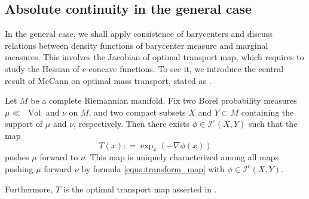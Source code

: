 \subsection{Absolute continuity in the general case}

In the general case, we shall apply consistence of barycenters and
discuss relations between density functions of barycenter measure and marginal measures.
This involves the Jacobian of optimal transport map,
which requires to study the Hessian of $c$-concave functions.
To see it, we introduce the central result of McCann \cite{mccann2001polar} on optimal mass transport,
stated as \cite[Theorem 3.2]{cordero2001riemannian}.
\begin{thm}
	\label{thm:optimal_transport_manifold}
	Let \( M \) be a complete Riemannian manifold.
	Fix two Borel probability measures \( \mu \ll \) $\operatorname{Vol}$ and \( \nu \) on \( M \),
	and two compact subsets \( X \) and \( Y \subset M \) containing the support of \( \mu \) and \( \nu \),
	respectively.
	Then there exists \( \phi \in \mathcal { I } ^ { c } ( X , Y ) \) such that the map
	\begin{equation}
		\label{equa:transform_map}
		T ( x ) : = \exp _ { x } ( - \nabla \phi ( x ) )
	\end{equation}
	pushes \( \mu \) forward to \( \nu \).
	This map is uniquely characterized among all maps pushing \( \mu \) forward \( \nu \) by formula \cref{equa:transform_map} with \( \phi \in \mathcal{I} ^ { c } ( X , Y )\).

	Furthermore, $T$ is the optimal transport map asserted in .
\end{thm}

